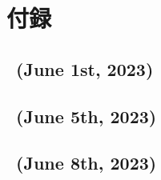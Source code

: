 \chapter*{付録}
\pagestyle{appendixstyle}
\setcounter{section}{0}
\renewcommand{\thelstlisting}{\thesection-\arabic{lstlisting}}
\renewcommand{\thesection}{\Alph{section}}
\newcommand{\secref}[1]{{#1}}
\makeatletter
{}
\makeatother
{}
\section{\kadaia\ (June 1st, 2023)}

\section{\kadaib\ (June 5th, 2023)}

\section{\kadaic\ (June 8th, 2023)}

